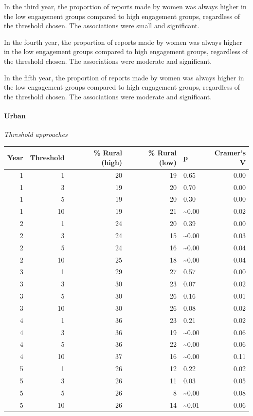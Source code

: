 \documentclass[
]{article}
\begin{document}
In the third year, the proportion of reports made by women was always
higher in the low engagement groups compared to high engagement groups,
regardless of the threshold chosen. The associations were small and
significant.

In the fourth year, the proportion of reports made by women was always
higher in the low engagement groups compared to high engagement groups,
regardless of the threshold chosen. The associations were moderate and
significant.

In the fifth year, the proportion of reports made by women was always
higher in the low engagement groups compared to high engagement groups,
regardless of the threshold chosen. The associations were moderate and
significant.

\hypertarget{urban}{%
\paragraph{Urban}\label{urban}}

\emph{Threshold approaches}

\begin{longtable}[]{@{}rrrrlr@{}}
\toprule
Year & Threshold & \% Rural (high) & \% Rural (low) & p & Cramer's V \\
\midrule
\endhead
1 & 1 & 20 & 19 & 0.65 & 0.00 \\
1 & 3 & 19 & 20 & 0.70 & 0.00 \\
1 & 5 & 19 & 20 & 0.30 & 0.00 \\
1 & 10 & 19 & 21 & \textasciitilde0.00 & 0.02 \\
2 & 1 & 24 & 20 & 0.39 & 0.00 \\
2 & 3 & 24 & 15 & \textasciitilde0.00 & 0.03 \\
2 & 5 & 24 & 16 & \textasciitilde0.00 & 0.04 \\
2 & 10 & 25 & 18 & \textasciitilde0.00 & 0.04 \\
3 & 1 & 29 & 27 & 0.57 & 0.00 \\
3 & 3 & 30 & 23 & 0.07 & 0.02 \\
3 & 5 & 30 & 26 & 0.16 & 0.01 \\
3 & 10 & 30 & 26 & 0.08 & 0.02 \\
4 & 1 & 36 & 23 & 0.21 & 0.02 \\
4 & 3 & 36 & 19 & \textasciitilde0.00 & 0.06 \\
4 & 5 & 36 & 22 & \textasciitilde0.00 & 0.06 \\
4 & 10 & 37 & 16 & \textasciitilde0.00 & 0.11 \\
5 & 1 & 26 & 12 & 0.22 & 0.02 \\
5 & 3 & 26 & 11 & 0.03 & 0.05 \\
5 & 5 & 26 & 8 & \textasciitilde0.00 & 0.08 \\
5 & 10 & 26 & 14 & \textasciitilde0.01 & 0.06 \\
\bottomrule
\end{longtable}
\end{document}
